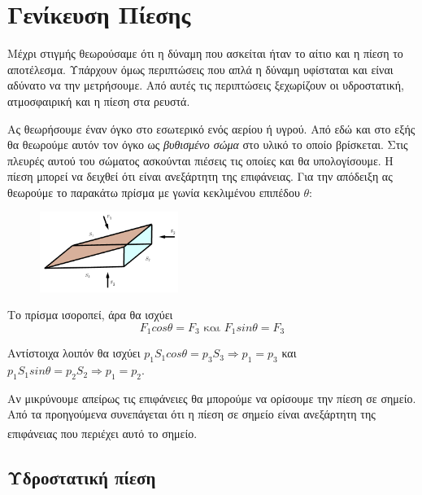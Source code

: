 \documentclass[12pt,titlepage]{article}
\begin{document}
\section{Γενίκευση Πίεσης}
Μέχρι στιγμής θεωρούσαμε ότι η δύναμη που ασκείται ήταν το αίτιο και η πίεση το αποτέλεσμα. Υπάρχουν όμως περιπτώσεις που απλά η δύναμη υφίσταται και είναι αδύνατο να την μετρήσουμε. Από αυτές τις περιπτώσεις ξεχωρίζουν οι υδροστατική, ατμοσφαιρική και η πίεση στα ρευστά.

Ας θεωρήσουμε έναν όγκο στο εσωτερικό ενός αερίου ή υγρού. Από εδώ και στο εξής θα θεωρούμε αυτόν τον όγκο ως \textit{βυθισμένο σώμα} στο υλικό το οποίο βρίσκεται. Στις πλευρές αυτού του σώματος ασκούνται πιέσεις τις οποίες και θα υπολογίσουμε. Η πίεση μπορεί να δειχθεί ότι είναι ανεξάρτητη της επιφάνειας. Για την απόδειξη ας θεωρούμε το παρακάτω πρίσμα με γωνία κεκλιμένου επιπέδου $θ$:

\begin{figure}[h]
 \includegraphics[width=0.4\textwidth]{Λευκάδα1.png}
 \centering
\end{figure}

Το πρίσμα ισοροπεί, άρα θα ισχύει
$$F_1 cosθ = F_3 \text{ και } F_1 sinθ = F_3$$

Αντίστοιχα λοιπόν θα ισχύει $p_1 S_1 cosθ = p_3 S_3 \Rightarrow p_1=p_3$ και $p_1 S_1 sinθ = p_2 S_2 \Rightarrow p_1=p_2$.

Αν μικρύνουμε απείρως τις επιφάνειες θα μπορούμε να ορίσουμε την πίεση σε σημείο. Από τα προηγούμενα συνεπάγεται ότι η πίεση σε σημείο είναι ανεξάρτητη της επιφάνειας που περιέχει αυτό το σημείο\textsuperscript{\cite{Feynman1}}.

\subsection{Υδροστατική πίεση}
\end{document}
